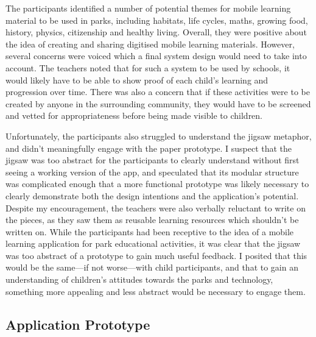 The participants identified a number of potential themes for mobile learning material to be used in parks, including habitats, life cycles, maths, growing food, history, physics, citizenship and healthy living. Overall, they were positive about the idea of creating and sharing digitised mobile learning materials. However, several concerns were voiced which a final system design would need to take into account. The teachers noted that for such a system to be used by schools, it would likely have to be able to show proof of each child’s learning and progression over time. There was also a concern that if these activities were to be created by anyone in the surrounding community, they would have to be screened and vetted for appropriateness before being made visible to children.

Unfortunately, the participants also struggled to understand the jigsaw metaphor, and didn't meaningfully engage with the paper prototype. I suspect that the jigsaw was too abstract for the participants to clearly understand without first seeing a working version of the app, and speculated that its modular structure was complicated enough that a more functional prototype was likely necessary to clearly demonstrate both the design intentions and the application’s potential. Despite my encouragement, the teachers were also verbally reluctant to write on the pieces, as they saw them as reusable learning resources which shouldn't be written on. While the participants had been receptive to the idea of a mobile learning application for park educational activities, it was clear that the jigsaw was too abstract of a prototype to gain much useful feedback. I posited that this would be the same---if not worse---with child participants, and that to gain an understanding of children’s attitudes towards the parks and technology, something more appealing and less abstract would be necessary to engage them. 

\subsection{Application Prototype}

